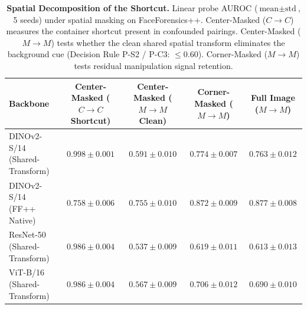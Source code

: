 \begin{table}[t]
\centering
\small
\caption{\textbf{Spatial Decomposition of the Shortcut.} Linear probe AUROC ($\text{mean} \pm \text{std}$, 5 seeds) under spatial masking on FaceForensics++. Center-Masked ($C\to C$) measures the container shortcut present in confounded pairings. Center-Masked ($M\to M$) tests whether the clean shared spatial transform eliminates the background cue (Decision Rule P-S2 / P-C3: $\le 0.60$). Corner-Masked ($M\to M$) tests residual manipulation signal retention.}
\label{tab:spatial_decomposition}
\begin{tabular}{lcccc}
\toprule
\textbf{Backbone} & \textbf{Center-Masked ($C\to C$ Shortcut)} & \textbf{Center-Masked ($M\to M$ Clean)} & \textbf{Corner-Masked ($M\to M$)} & \textbf{Full Image ($M\to M$)} \\
\midrule
DINOv2-S/14 (Shared-Transform) & $0.998 \pm 0.001$ & $0.591 \pm 0.010$ & $0.774 \pm 0.007$ & $0.763 \pm 0.012$ \\
DINOv2-S/14 (FF++ Native) & $0.758 \pm 0.006$ & $0.755 \pm 0.010$ & $0.872 \pm 0.009$ & $0.877 \pm 0.008$ \\
ResNet-50 (Shared-Transform) & $0.986 \pm 0.004$ & $0.537 \pm 0.009$ & $0.619 \pm 0.011$ & $0.613 \pm 0.013$ \\
ViT-B/16 (Shared-Transform) & $0.986 \pm 0.004$ & $0.567 \pm 0.009$ & $0.706 \pm 0.012$ & $0.690 \pm 0.010$ \\
\bottomrule
\end{tabular}
\end{table}


